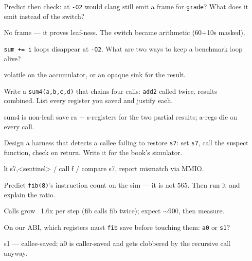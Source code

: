 \begin{exercise}[medium]\label{ex:m04c}
Predict then check: at \texttt{-O2} would clang still emit a frame
for \texttt{grade}? What does it emit instead of the switch?
\end{exercise}
\begin{solution}[hint]
No frame --- it proves leaf-ness. The switch became arithmetic
(60+10s masked).
\end{solution}

\begin{exercise}[medium]\label{ex:m04d}
\texttt{sum += i} loops disappear at \texttt{-O2}. What are two ways
to keep a benchmark loop alive?
\end{exercise}
\begin{solution}[hint]
volatile on the accumulator, or an opaque sink for the result.
\end{solution}

\begin{exercise}[hard]\label{ex:h04a}
Write a \texttt{sum4(a,b,c,d)} that chains four calls: \texttt{add2}
called twice, results combined. List every register you saved and
justify each.
\end{exercise}
\begin{solution}[hint]
sum4 is non-leaf: save ra + s-registers for the two partial results;
a-regs die on every call.
\end{solution}

\begin{exercise}[hard]\label{ex:h04b}
Design a harness that detects a callee failing to restore
\texttt{s7}: set \texttt{s7}, call the suspect function, check on
return. Write it for the book's simulator.
\end{exercise}
\begin{solution}[hint]
li s7,<sentinel> / call f / compare s7, report mismatch via MMIO.
\end{solution}

\begin{exercise}[hard]\label{ex:h04c}
Predict \texttt{fib(8)}'s instruction count on the sim --- it is
not 565. Then run it and explain the ratio.
\end{exercise}
\begin{solution}[hint]
Calls grow ~1.6x per step (fib calls fib twice); expect $\sim$900,
then measure.
\end{solution}


\begin{exercise}[easy]\label{ex:e04g}
On our ABI, which registers must \texttt{fib} save before touching
them: \texttt{a0} or \texttt{s1}?
\end{exercise}
\begin{solution}[hint]
s1 --- callee-saved; a0 is caller-saved and gets clobbered by the
recursive call anyway.
\end{solution}

